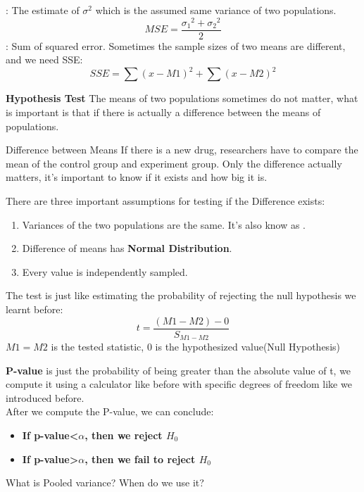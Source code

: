 : The estimate of \(\sigma^2\) which is the assumed same variance of two populations.
\begin{equation}
    MSE=\frac{{\sigma_1}^2+{\sigma_2}^2}{2}
\end{equation}
: Sum of squared error. Sometimes the sample sizes of two means are different, and we need SSE:
\begin{equation}
    SSE= \sum\left (x-M1 \right )^{2}+\sum \left ( x-M2 \right )^{2}
\end{equation}

\textbf{Hypothesis Test}
The means of two populations sometimes do not matter, what is important is that if there is actually a difference between the means of populations. 
\\
\begin{examplebox}{Difference between Means}
    If there is a new drug, researchers have to compare the mean of the control group and experiment group. Only the difference actually matters, it's important to know if it exists and how big it is.
\end{examplebox}
\vbox{}
There are three important assumptions for testing if the Difference exists:
\begin{enumerate}
    \item Variances of the two populations are the same. It's also know as .
    \item Difference of means has \textbf{Normal Distribution}.
    \item Every value is independently sampled.
\end{enumerate}

The test is just like estimating the probability of rejecting the null hypothesis we learnt before:
\begin{equation}
    t=\frac{(M1-M2)-0}{S_{M1-M2}}
\end{equation}
\(M1=M2\) is the tested statistic, 0 is the hypothesized value(Null Hypothesis)

\textbf{P-value} is just the probability of being greater than the absolute value of t, we compute it using a calculator like before with specific degrees of freedom like we introduced before.
\\After we compute the P-value, we can conclude:
\begin{itemize}
   \item \textbf{If p-value<\(\alpha\), then we reject \(H_0\)}
    \item \textbf{If p-value>\(\alpha\), then we fail to reject \(H_0\)}
\end{itemize}
\begin{Question}
    What is Pooled variance? When do we use it?
\end{Question}

